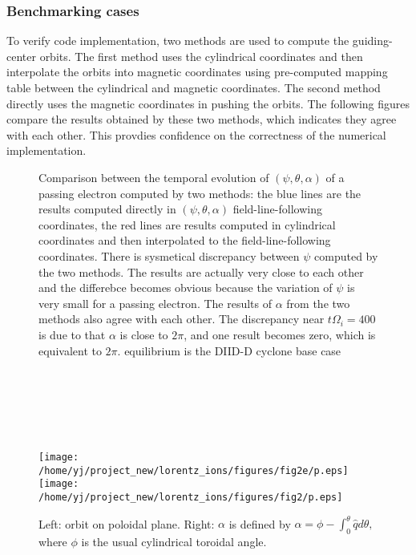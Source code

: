 \documentclass{article}
\begin{document}
\subsubsection{Benchmarking cases}

To verify code implementation, two methods are used to compute the
guiding-center orbits. The first method uses the cylindrical coordinates and
then interpolate the orbits into magnetic coordinates using pre-computed
mapping table between the cylindrical and magnetic coordinates. The second
method directly uses the magnetic coordinates in pushing the orbits. The
following figures compare the results obtained by these two methods, which
indicates they agree with each other. This provdies confidence on the
correctness of the numerical implementation.

\begin{figure}[h]
  \caption{\label{18-2-4-e1}Comparison between the temporal evolution of
  $(\psi, \theta, \alpha)$ of a passing electron computed by two methods: the
  blue lines are the results computed directly in $(\psi, \theta, \alpha)$
  field-line-following coordinates, the red lines are results computed in
  cylindrical coordinates and then interpolated to the field-line-following
  coordinates. There is sysmetical discrepancy between $\psi$ computed by the
  two methods. The results are actually very close to each other and the
  differebce becomes obvious because the variation of $\psi$ is very small for
  a passing electron.
  The results of $\alpha$ from the two methods also agree with each other.
  The discrepancy near $t \Omega_i = 400$ is due to that $\alpha$ is close to
  $2 \pi$, and one result becomes zero, which is equivalent to $2 \pi$.
  equilibrium is the DIID-D cyclone base case}
\end{figure}

\

\

\

\begin{figure}[h]
  \texttt{[image: /home/yj/project\_new/lorentz\_ions/figures/fig2e/p.eps]}\texttt{[image: /home/yj/project\_new/lorentz\_ions/figures/fig2/p.eps]}
  \caption{Left: orbit on poloidal plane. Right: $\alpha$ is defined by
  $\alpha = \phi - \int_0^{\theta} \hat{q} d \theta,$ where $\phi$ is the
  usual cylindrical toroidal angle.}
\end{figure}

\
\end{document}

